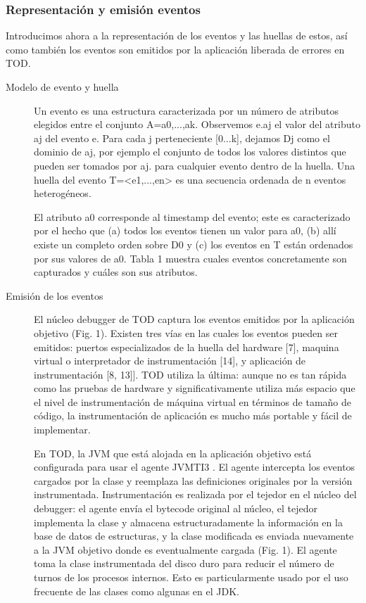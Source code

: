 \documentclass[12pt,a4paper]{report}
\begin{document}
			\subsubsection{Representación y emisión eventos}

Introducimos ahora a la representación de los eventos y las huellas de estos, así como también los eventos son emitidos por la aplicación liberada de errores en TOD.

\begin{description}

	\item[Modelo de evento y huella] Un evento es una estructura caracterizada por un número de atributos elegidos entre el conjunto A={a0,...,ak}.   Observemos e.aj el valor del atributo aj del evento e.  Para cada j perteneciente [0...k], dejamos Dj como el dominio de aj, por ejemplo el conjunto de todos los valores distintos que pueden ser tomados por aj. para cualquier evento dentro de la huella.  Una huella del evento T=<e1,...,en> es una secuencia ordenada de n eventos heterogéneos.

El atributo a0 corresponde al timestamp del evento; este es caracterizado por el hecho que (a) todos los eventos tienen un valor para a0, (b) allí existe un completo orden sobre D0 y (c) los eventos en T están ordenados por sus valores de a0.  Tabla 1 muestra cuales eventos concretamente son capturados y cuáles son sus atributos.

	\item[Emisión de los eventos]  El núcleo debugger de TOD captura los eventos emitidos por la aplicación objetivo (Fig. 1).  Existen tres vías en las cuales los eventos pueden ser emitidos:  puertos especializados de la huella del hardware [7],  maquina virtual o interpretador de instrumentación [14], y aplicación de instrumentación [8, 13]].  TOD utiliza la última:  aunque no es tan rápida como las pruebas de hardware y significativamente utiliza más espacio que el nivel de instrumentación de máquina virtual en términos de tamaño de código, la instrumentación de aplicación es mucho más portable y fácil de implementar.

En TOD, la JVM que está alojada en la aplicación objetivo está configurada para usar el agente  JVMTI3 .  El agente intercepta los eventos cargados por la clase y reemplaza las definiciones originales por la versión instrumentada.  Instrumentación es realizada por el tejedor en el núcleo del debugger:  el agente envía el bytecode original al núcleo,  el tejedor implementa la clase y almacena estructuradamente la información en la base de datos de estructuras, y la clase modificada es enviada nuevamente a la JVM objetivo donde es eventualmente cargada (Fig. 1).  El agente toma la clase instrumentada del disco duro para reducir el número de turnos de los procesos internos.  Esto es  particularmente usado por el uso frecuente de las clases como algunas en el JDK.


\end{description}
\end{document}
